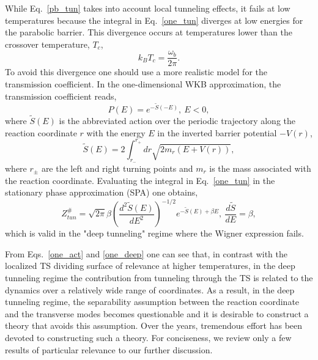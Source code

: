 \documentclass[journal=jpcafh,manuscript=article]{achemso}
\begin{document}
While Eq.~\ref{pb_tun} takes into account local tunneling effects, it
fails at low temperatures because the integral in Eq.~\ref{one_tun} diverges at low
energies for the parabolic barrier. This divergence occurs at temperatures lower than
the crossover temperature, $T_c$,
\begin{equation}
  \label{cross}
  k_BT_c= \frac{\omega_b}{2\pi}.
\end{equation}
To avoid this divergence one should use a more realistic model for the
transmission coefficient. In the one-dimensional WKB approximation,
the transmission coefficient reads,
\begin{equation}
  \label{wkb_tc}
  P(E) = e^{-\tilde{S}(-E)},\ E < 0,
\end{equation}
where $\tilde{S}(E)$ is the abbreviated action over the periodic trajectory along
the reaction coordinate $r$ with the energy $E$ in the inverted barrier
potential $-V(r)$,
\begin{equation}
  \label{one_act}
  \tilde{S}(E) = 2 \int_{r_-}^{r_+}dr \sqrt{2m_r(E+V(r))},
\end{equation}
where $r_\pm$ are the left and right turning points and $m_r$ is the
mass associated with the reaction coordinate. Evaluating the integral in
Eq.~\ref{one_tun} in the stationary phase approximation (SPA) one obtains,
\begin{equation}
  \label{one_deep}
  Z^\#_{tun}= \sqrt{2\pi} \beta\left(\frac{d^2\tilde{S}(E)}{dE^2}\right)^{-1/2}e^{-\tilde{S}(E) + \beta E},\
  \frac{d\tilde{S}}{dE} = \beta,
\end{equation}
which is valid in the "deep tunneling" regime where the Wigner
expression fails.

From Eqs.~\ref{one_act} and \ref{one_deep} one can see that, in
contrast with the localized TS dividing surface of relevance at higher
temperatures, in the deep tunneling regime the contribution from
tunneling through the TS is related to the dynamics over a relatively
wide range of coordinates. As a result, in the deep tunneling regime,
the separability assumption between the reaction coordinate and the
transverse modes becomes questionable and it is desirable to construct
a theory that avoids this assumption. Over the years, tremendous
effort has been devoted to constructing such a theory.  For
conciseness, we review only a few results of particular relevance to
our further discussion.
\end{document}
